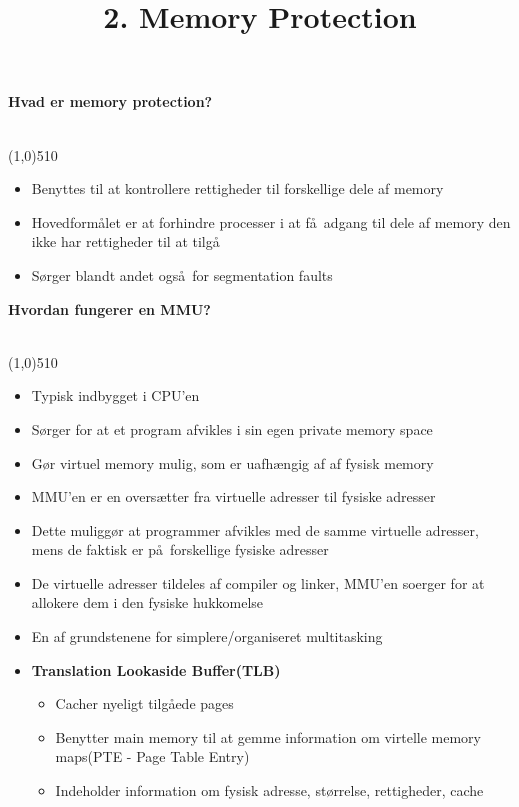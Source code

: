 \documentclass{paper}
\title{2. Memory Protection}
\begin{document}
\maketitle
\begin{large}\textbf{Hvad er memory protection?}\end{large}\\
\line(1,0){510}
\begin{itemize}
	\item Benyttes til at kontrollere rettigheder til forskellige dele af memory
	\item Hovedform\aa let er at forhindre processer i at f\aa\ adgang til dele af memory den ikke har rettigheder til at tilg\aa\
	\item S\o rger blandt andet ogs\aa\ for segmentation faults\\
\end{itemize}

\begin{large}\textbf{Hvordan fungerer en MMU?}\end{large}\\
\line(1,0){510}
\begin{itemize}
	\item Typisk indbygget i CPU'en
	\item S\o rger for at et program afvikles i sin egen private memory space
	\item G\o r virtuel memory mulig, som er uafh\ae ngig af af fysisk memory
	\item MMU'en er en overs\ae tter fra virtuelle adresser til fysiske adresser
	\item Dette muligg\o r at programmer afvikles med de samme virtuelle adresser, mens de faktisk er p\aa\ forskellige fysiske adresser
	\item De virtuelle adresser tildeles af compiler og linker, MMU'en soerger for at allokere dem i den fysiske hukkomelse
	\item En af grundstenene for simplere/organiseret multitasking\\
	\item \textbf{Translation Lookaside Buffer(TLB)}
	\begin{itemize}
		\item Cacher nyeligt tilg\aa ede pages
		\item Benytter main memory til at gemme information om virtelle memory maps(PTE - Page Table Entry)
		\item Indeholder information om fysisk adresse, st\o rrelse, rettigheder, cache\\
	\end{itemize}
\end{itemize}
\end{document}

